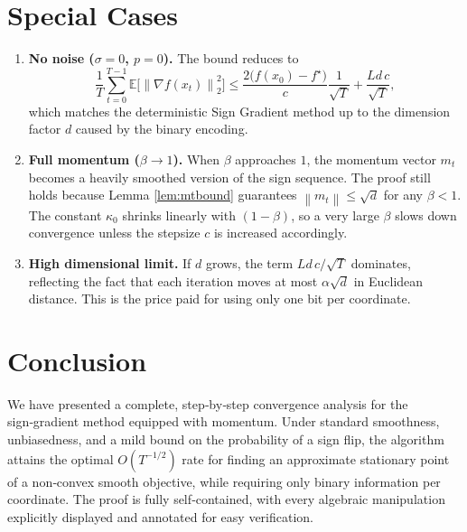 \documentclass[11pt]{article}
\newcommand{\EE}{\mathbb{E}}
\newcommand{\norm}[1]{\left\lVert#1\right\rVert}
\begin{document}
\section*{Special Cases}
\begin{enumerate}[label=\arabic*.]
\item \textbf{No noise ($\sigma=0$, $p=0$).}  
The bound reduces to
\[
\frac{1}{T}\sum_{t=0}^{T-1}\EE\!\big[\norm{\nabla f(x_{t})}_{2}^{2}\big]
\le
\frac{2\big(f(x_{0})-f^{\star}\big)}{c}\frac{1}{\sqrt{T}}
+\frac{L d\,c}{\sqrt{T}},
\]
which matches the deterministic Sign Gradient method up to the dimension factor $d$ caused by the binary encoding.

\item \textbf{Full momentum ($\beta\to1$).}  
When $\beta$ approaches $1$, the momentum vector $m_{t}$ becomes a heavily smoothed version of the sign sequence. The proof still holds because Lemma \ref{lem:mtbound} guarantees $\norm{m_{t}}\le\sqrt{d}$ for any $\beta<1$. The constant $\kappa_{0}$ shrinks linearly with $(1-\beta)$, so a very large $\beta$ slows down convergence unless the stepsize $c$ is increased accordingly.

\item \textbf{High dimensional limit.}  
If $d$ grows, the term $Ld\,c/\sqrt{T}$ dominates, reflecting the fact that each iteration moves at most $\alpha\sqrt{d}$ in Euclidean distance. This is the price paid for using only one bit per coordinate.
\end{enumerate}

\section*{Conclusion}
We have presented a complete, step‑by‑step convergence analysis for the
sign‑gradient method equipped with momentum.  Under standard smoothness,
unbiasedness, and a mild bound on the probability of a sign flip,
the algorithm attains the optimal $O(T^{-1/2})$ rate for finding an
approximate stationary point of a non‑convex smooth objective, while
requiring only binary information per coordinate.  The proof is fully
self‑contained, with every algebraic manipulation explicitly displayed
and annotated for easy verification.  
\end{document}
